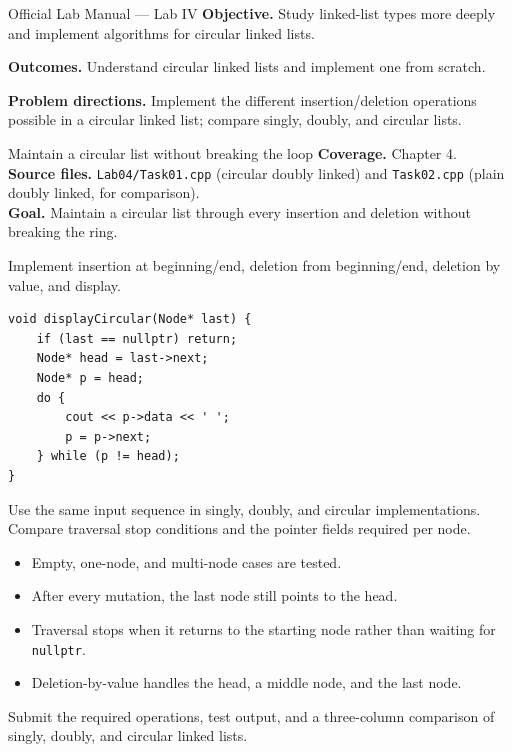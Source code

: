 
\begin{sourcealignment}{Official Lab Manual --- Lab IV}
\textbf{Objective.} Study linked-list types more deeply and implement algorithms for circular linked lists.

\textbf{Outcomes.} Understand circular linked lists and implement one from scratch.

\textbf{Problem directions.} Implement the different insertion/deletion operations possible in a circular linked list; compare singly, doubly, and circular lists.
\end{sourcealignment}

\begin{labproject}{Maintain a circular list without breaking the loop}
\textbf{Coverage.} Chapter 4.\\
\textbf{Source files.} \texttt{Lab04/Task01.cpp} (circular doubly linked) and \texttt{Task02.cpp} (plain doubly linked, for comparison).\\
\textbf{Goal.} Maintain a circular list through every insertion and deletion without breaking the ring.

Implement insertion at beginning/end, deletion from beginning/end, deletion by value, and display.

\begin{lstlisting}
void displayCircular(Node* last) {
    if (last == nullptr) return;
    Node* head = last->next;
    Node* p = head;
    do {
        cout << p->data << ' ';
        p = p->next;
    } while (p != head);
}
\end{lstlisting}

\begin{tryit}
Use the same input sequence in singly, doubly, and circular implementations. Compare traversal stop conditions and the pointer fields required per node.
\end{tryit}
\end{labproject}

\begin{verification}
\begin{itemize}
  \item Empty, one-node, and multi-node cases are tested.
  \item After every mutation, the last node still points to the head.
  \item Traversal stops when it returns to the starting node rather than waiting for \texttt{nullptr}.
  \item Deletion-by-value handles the head, a middle node, and the last node.
\end{itemize}
\end{verification}

\begin{labdeliverable}
Submit the required operations, test output, and a three-column comparison of singly, doubly, and circular linked lists.
\end{labdeliverable}
